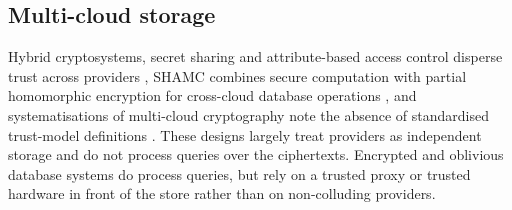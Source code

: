 \documentclass[a4paper,fleqn]{cas-dc}
\begin{document}
\subsection{Multi-cloud storage}
Hybrid cryptosystems, secret sharing and attribute-based access control
disperse trust across providers
\citep{bharot2025cloudlock,muthuvel2026design}, SHAMC combines secure
computation with partial homomorphic encryption for cross-cloud database
operations \citep{wang2020shamc}, and systematisations of multi-cloud
cryptography note the absence of standardised trust-model definitions
\citep{cryptoeprint:2026/207}. These designs largely treat providers as
independent storage and do not process queries over the ciphertexts.
Encrypted and oblivious database systems
\citep{poddar2019arx,crooks2018obladi,dauterman2021snoopy} do process queries,
but rely on a trusted proxy or trusted hardware in front of the store rather
than on non-colluding providers.
\end{document}
